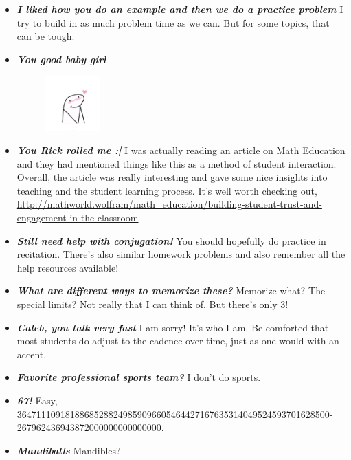 \documentclass[11pt,letterpaper]{article}
\begin{document}
\begin{itemize}
\item {\bfseries\itshape I liked how you do an example and then we do a practice problem} I try to build in as much problem time as we can. But for some topics, that can be tough. 

\item {\bfseries\itshape You good baby girl}
	\begin{figure}[H]
	\centering
	\includegraphics[width=0.20\textwidth]{images/blush.png}
	\end{figure}

\item {\bfseries\itshape You Rick rolled me :| } I was actually reading an article on Math Education and they had mentioned things like this as a method of student interaction. Overall, the article was really interesting and gave some nice insights into teaching and the student learning process. It's well worth checking out, \href{https://www.youtube.com/watch?v=dQw4w9WgXcQ}{http://mathworld.wolfram/math\_education/building-student-trust-and-engagement-in-the-classroom}

\item {\bfseries\itshape Still need help with conjugation!} You should hopefully do practice in recitation. There's also similar homework problems and also remember all the help resources available! 

\item {\bfseries\itshape What are different ways to memorize these?} Memorize what? The special limits? Not really that I can think of. But there's only 3!

\item {\bfseries\itshape Caleb, you talk very fast} I am sorry! It's who I am. Be comforted that most students do adjust to the cadence over time, just as one would with an accent. 

\item {\bfseries\itshape Favorite professional sports team?} I don't do sports. 

\item {\bfseries\itshape 67!} Easy, 36471110918188685288249859096605464427167635314049524593701628500- 267962436943872000000000000000.

\item {\bfseries\itshape Mandiballs} Mandibles?


\end{itemize}
\end{document}
